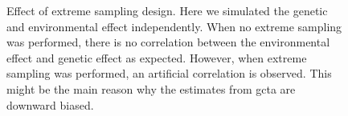 	\begin{figure}
		\centering
		\caption[Effect of Extreme Sampling Design]
		{Effect of extreme sampling design.
			Here we simulated the genetic and environmental effect independently.
			When no extreme sampling was performed, there is no correlation between the environmental effect and genetic effect as expected.
			However, when extreme sampling was performed, an artificial correlation is observed.
			This might be the main reason why the estimates from \gls{gcta} are downward biased.
		} 
		\label{fig:extremeSampling}
	\end{figure}
	
